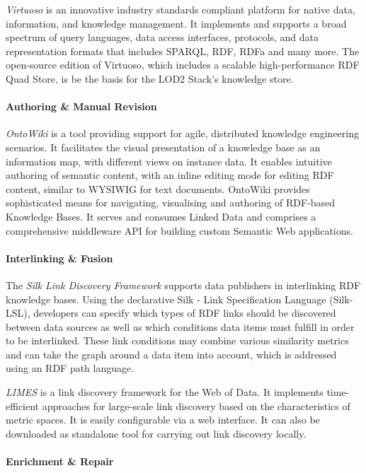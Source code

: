 \documentclass[a4paper, 11pt]{llncs}
\begin{document}
\emph{Virtuoso} \cite{virtuoso} is an innovative industry standards compliant platform for native data, information, and knowledge management.
It implements and supports a broad spectrum of query languages, data access interfaces, protocols, and data representation formats that includes SPARQL, RDF, RDFa and many more.
The open-source edition of Virtuoso, which includes a scalable high-performance RDF Quad Store, is be the basis for the LOD2 Stack's knowledge store.

\paragraph{Authoring \& Manual Revision}

\emph{OntoWiki} \cite{auer-s-2006-736-a} is a tool providing support for agile, distributed knowledge engineering scenarios.
It facilitates the visual presentation of a knowledge base as an information map, with different views on instance data.
It enables intuitive authoring of semantic content, with an inline editing mode for editing RDF content, similar to WYSIWIG for text documents.
OntoWiki provides sophisticated means for navigating, visualising and authoring of RDF-based Knowledge Bases.
It serves and consumes Linked Data and comprises a comprehensive middleware API for building custom Semantic Web applications.

\paragraph{Interlinking \& Fusion}

The \emph{Silk Link Discovery Framework} \cite{silk} supports data publishers in interlinking RDF knowledge bases.
Using the declarative Silk - Link Specification Language (Silk-LSL), developers can specify which types of RDF links should be discovered between data sources as well as which conditions data items must fulfill in order to be interlinked.
These link conditions may combine various similarity metrics and can take the graph around a data item into account, which is addressed using an RDF path language.

\emph{LIMES} \cite{limes} is a link discovery framework for the Web of Data.
It implements time-efficient approaches for large-scale link discovery based on the characteristics of metric spaces.
It is easily configurable via a web interface. It can also be downloaded as standalone tool for carrying out link discovery locally.

\paragraph{Enrichment \& Repair}
\end{document}
